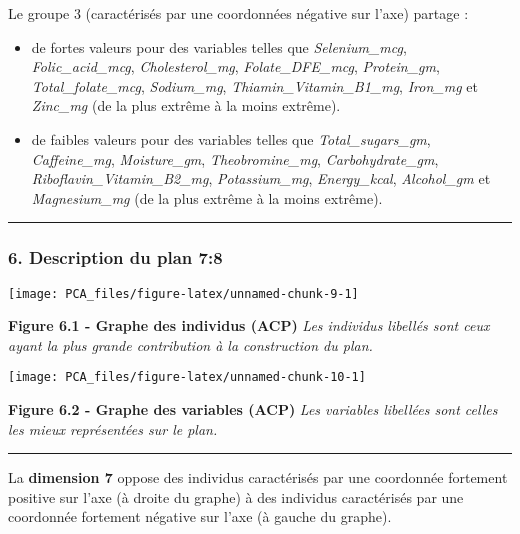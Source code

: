 \documentclass[]{article}
\providecommand{\tightlist}{%
  \setlength{\itemsep}{0pt}\setlength{\parskip}{0pt}}
\begin{document}
Le groupe 3 (caractérisés par une coordonnées négative sur l'axe)
partage :

\begin{itemize}
\tightlist
\item
  de fortes valeurs pour des variables telles que \emph{Selenium\_mcg},
  \emph{Folic\_acid\_mcg}, \emph{Cholesterol\_mg},
  \emph{Folate\_DFE\_mcg}, \emph{Protein\_gm},
  \emph{Total\_folate\_mcg}, \emph{Sodium\_mg},
  \emph{Thiamin\_Vitamin\_B1\_mg}, \emph{Iron\_mg} et \emph{Zinc\_mg}
  (de la plus extrême à la moins extrême).
\item
  de faibles valeurs pour des variables telles que
  \emph{Total\_sugars\_gm}, \emph{Caffeine\_mg}, \emph{Moisture\_gm},
  \emph{Theobromine\_mg}, \emph{Carbohydrate\_gm},
  \emph{Riboflavin\_Vitamin\_B2\_mg}, \emph{Potassium\_mg},
  \emph{Energy\_kcal}, \emph{Alcohol\_gm} et \emph{Magnesium\_mg} (de la
  plus extrême à la moins extrême).
\end{itemize}

\begin{center}\rule{0.5\linewidth}{\linethickness}\end{center}

\subsubsection{6. Description du plan 7:8}\label{description-du-plan-78}

\begin{center}\texttt{[image: PCA\_files/figure-latex/unnamed-chunk-9-1]} \end{center}

\textbf{Figure 6.1 - Graphe des individus (ACP)} \emph{Les individus
libellés sont ceux ayant la plus grande contribution à la construction
du plan.}

\begin{center}\texttt{[image: PCA\_files/figure-latex/unnamed-chunk-10-1]} \end{center}

\textbf{Figure 6.2 - Graphe des variables (ACP)} \emph{Les variables
libellées sont celles les mieux représentées sur le plan.}

\begin{center}\rule{0.5\linewidth}{\linethickness}\end{center}

La \textbf{dimension 7} oppose des individus caractérisés par une
coordonnée fortement positive sur l'axe (à droite du graphe) à des
individus caractérisés par une coordonnée fortement négative sur l'axe
(à gauche du graphe).
\end{document}
